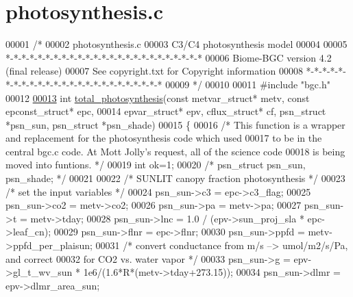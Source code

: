 \hypertarget{photosynthesis_8c_source}{}\section{photosynthesis.\+c}
\label{photosynthesis_8c_source}

\begin{DoxyCode}
00001 \textcolor{comment}{/*}
00002 \textcolor{comment}{photosynthesis.c}
00003 \textcolor{comment}{C3/C4 photosynthesis model}
00004 \textcolor{comment}{}
00005 \textcolor{comment}{*-*-*-*-*-*-*-*-*-*-*-*-*-*-*-*-*-*-*-*-*-*-*-*-*}
00006 \textcolor{comment}{Biome-BGC version 4.2 (final release)}
00007 \textcolor{comment}{See copyright.txt for Copyright information}
00008 \textcolor{comment}{*-*-*-*-*-*-*-*-*-*-*-*-*-*-*-*-*-*-*-*-*-*-*-*-*}
00009 \textcolor{comment}{*/}
00010 
00011 \textcolor{preprocessor}{#include "bgc.h"}
00012 
\hypertarget{photosynthesis_8c_source_l00013}{}\hyperlink{photosynthesis_8c_adba4d3b53331ea3e9e08cd7d0fcec8d4}{00013} \textcolor{keywordtype}{int} \hyperlink{photosynthesis_8c_adba4d3b53331ea3e9e08cd7d0fcec8d4}{total\_photosynthesis}(\textcolor{keyword}{const} metvar\_struct* metv, \textcolor{keyword}{const} epconst\_struct* epc, 
00014             epvar\_struct* epv, cflux\_struct* cf, psn\_struct *psn\_sun, psn\_struct *psn\_shade)
00015 \{
00016     \textcolor{comment}{/* This function is a wrapper and replacement for the photosynthesis code which used}
00017 \textcolor{comment}{        to be in the central bgc.c code.  At Mott Jolly's request, all of the science code}
00018 \textcolor{comment}{        is being moved into funtions. */}
00019     \textcolor{keywordtype}{int} ok=1;
00020     \textcolor{comment}{/* psn\_struct psn\_sun, psn\_shade; */}
00021 
00022     \textcolor{comment}{/* SUNLIT canopy fraction photosynthesis */}
00023   \textcolor{comment}{/* set the input variables */}
00024     psn\_sun->c3 = epc->c3\_flag;
00025     psn\_sun->co2 = metv->co2;
00026     psn\_sun->pa = metv->pa;
00027     psn\_sun->t = metv->tday;
00028     psn\_sun->lnc = 1.0 / (epv->sun\_proj\_sla * epc->leaf\_cn);
00029     psn\_sun->flnr = epc->flnr;
00030     psn\_sun->ppfd = metv->ppfd\_per\_plaisun;
00031     \textcolor{comment}{/* convert conductance from m/s --> umol/m2/s/Pa, and correct}
00032 \textcolor{comment}{    for CO2 vs. water vapor */}
00033     psn\_sun->g = epv->gl\_t\_wv\_sun * 1e6/(1.6*R*(metv->tday+273.15));
00034     psn\_sun->dlmr = epv->dlmr\_area\_sun;

\end{DoxyCode}
